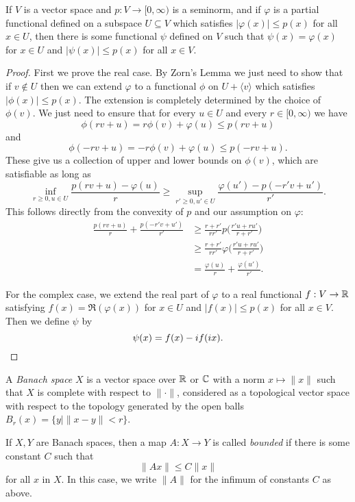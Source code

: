 \begin{thm} If $V$ is a vector space and $p : V \rightarrow [0,\infty)$ is a seminorm, and if $\varphi$ is a partial functional defined on a subspace $U \subseteq V$ which satisfies $|\varphi(x)| \le p(x)$ for all $x \in U$, then there is some functional $\psi$ defined on $V$ such that $\psi(x) = \varphi(x)$ for $x \in U$ and $|\psi(x)| \le p(x)$ for all $x \in V$.
\end{thm}
\begin{proof} First we prove the real case. By Zorn's Lemma we just need to show that if $v \not\in U$ then we can extend $\varphi$ to a functional $\phi$ on $U + \langle v \rangle$ which satisfies $|\phi(x)| \le p(x)$. The extension is completely determined by the choice of $\phi(v)$. We just need to ensure that for every $u \in U$ and every $r \in [0,\infty)$ we have
\[
\phi(rv + u) = r\phi(v) + \varphi(u) \le p(rv + u)
\]
and
\[
\phi(-rv + u) = -r\phi(v) + \varphi(u) \le p(-rv + u).
\]
These give us a collection of upper and lower bounds on $\phi(v)$, which are satisfiable as long as
\[
\inf_{r\ge 0, u \in U} \frac{p(rv + u) - \varphi(u)}{r} \ge \sup_{r' \ge 0, u' \in U} \frac{\varphi(u') - p(-r'v + u')}{r'}.
\]
This follows directly from the convexity of $p$ and our assumption on $\varphi$:
\begin{align*}
\frac{p(rv + u)}{r} + \frac{p(-r'v + u')}{r'} &\ge \frac{r + r'}{rr'}p\Big(\frac{r'u + ru'}{r + r'}\Big)\\
&\ge \frac{r + r'}{rr'}\varphi\Big(\frac{r'u + ru'}{r + r'}\Big)\\
&= \frac{\varphi(u)}{r} + \frac{\varphi(u')}{r'}.
\end{align*}

For the complex case, we extend the real part of $\varphi$ to a real functional $f : V \rightarrow \mathbb{R}$ satisfying $f(x) = \Re(\varphi(x))$ for $x \in U$ and $|f(x)| \le p(x)$ for all $x \in V$. Then we define $\psi$ by
\[
\psi(x) = f(x) - if(ix).\qedhere
\]
\end{proof}

\begin{defn} A \emph{Banach space} $X$ is a vector space over $\mathbb{R}$ or $\mathbb{C}$ with a norm $x \mapsto \|x\|$ such that $X$ is complete with respect to $\|\cdot\|$, considered as a topological vector space with respect to the topology generated by the open balls $B_r(x) = \{y \mid \|x-y\| < r\}$.

If $X,Y$ are Banach spaces, then a map $A : X \rightarrow Y$ is called \emph{bounded} if there is some constant $C$ such that
\[
\|Ax\| \le C\|x\|
\]
for all $x$ in $X$. In this case, we write $\|A\|$ for the infimum of constants $C$ as above.
\end{defn}

